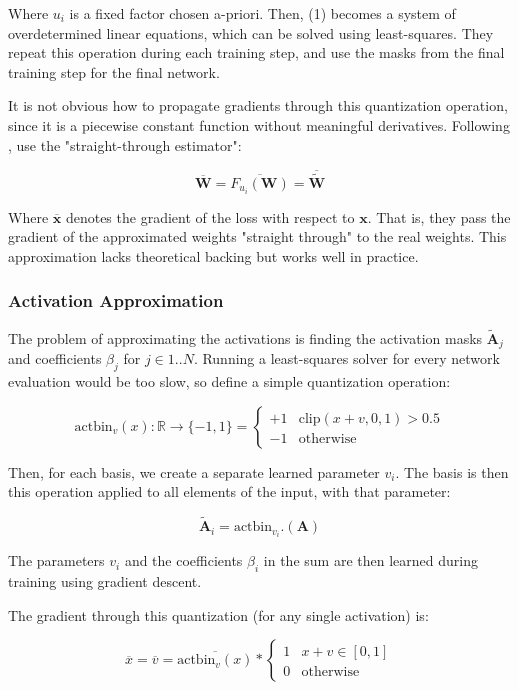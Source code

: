 \documentclass[12pt]{article}
\newcommand{\xv}[0]{\mathbf{x}}
\newcommand*{\Wv}[0]{\mathbf{W}}
\newcommand*{\Av}[0]{\mathbf{A}}
\newcommand*{\Wa}[0]{\widetilde{\mathbf{W}}}
\newcommand*{\Aa}[0]{\widetilde{\mathbf{A}}}
\newcommand*\lgrad[1]{\overline{#1}}
\begin{document}
Where \(u_i\) is a fixed factor chosen a-priori. Then, (1) becomes a system of overdetermined linear equations, which can be solved using least-squares. They repeat this operation
during each training step, and use the masks from the final training step for the final network.

It is not obvious how to propagate gradients through this quantization operation, since it is a piecewise constant function without meaningful derivatives.
Following \citet{BinarizedNeuralNetworks}, \citet{ABCNets} use the "straight-through estimator":

$$\overline{\Wv} = \overline{F_{u_i}(\Wv)} = \overline{\Wa}$$

Where \(\lgrad{\xv}\) denotes the gradient of the loss with respect to \(\xv\). That is, they pass the gradient of the approximated weights "straight through" to the real weights. This approximation lacks theoretical backing but works well in practice.

\subsubsection{Activation Approximation}
\label{sec:org9f24f8d}
The problem of approximating the activations is finding the activation masks \(\Aa_j\) and coefficients \(\beta_j\) for \(j \in 1..N\). Running a least-squares solver for every network evaluation would be too slow, so \citet{ABCNets} define a simple quantization operation:

$$\mathrm{actbin}_v(x) : \mathbb{R} \to \{-1, 1\} = \begin{cases}
   +1 & \mathrm{clip}(x + v, 0, 1) > 0.5 \\
   -1 & \mathrm{otherwise}
\end{cases}$$

Then, for each basis, we create a separate learned parameter \(v_i\).
The basis is then this operation applied to all elements of the input, with that parameter:

$$\Aa_i = \mathrm{actbin}_{v_i}.(\Av)$$

The parameters \(v_i\) and the coefficients \(\beta_i\) in the sum are then learned during training using gradient descent.

The gradient through this quantization (for any single activation) is:

$$\lgrad{x} = \lgrad{v} = \lgrad{\mathrm{actbin}_v(x)} * \begin{cases}
1 & x + v \in [0, 1] \\
0 & \mathrm{otherwise}
\end{cases}$$
\end{document}
